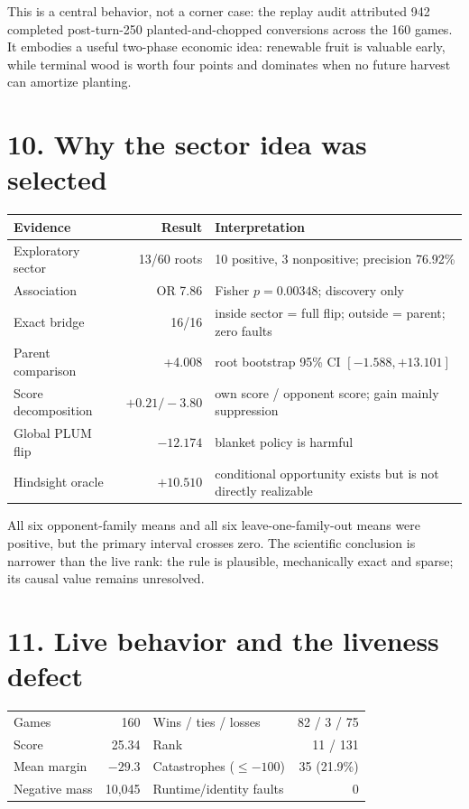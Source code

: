 \documentclass[10pt,a4paper]{article}
\begin{document}
This is a central behavior, not a corner case: the replay audit attributed 942 completed
post-turn-250 planted-and-chopped conversions across the 160 games. It embodies a useful
two-phase economic idea: renewable fruit is valuable early, while terminal wood is worth
four points and dominates when no future harvest can amortize planting.

\section*{10. Why the sector idea was selected}

\begin{tabularx}{\textwidth}{@{}l r Y@{}}
\toprule
\textbf{Evidence} & \textbf{Result} & \textbf{Interpretation} \\
\midrule
Exploratory sector & 13/60 roots & 10 positive, 3 nonpositive; precision 76.92\% \\
Association & OR 7.86 & Fisher $p=0.00348$; discovery only \\
Exact bridge & 16/16 & inside sector = full flip; outside = parent; zero faults \\
Parent comparison & +4.008 & root bootstrap 95\% CI $[-1.588,+13.101]$ \\
Score decomposition & $+0.21/-3.80$ & own score / opponent score; gain mainly suppression \\
Global PLUM flip & $-12.174$ & blanket policy is harmful \\
Hindsight oracle & $+10.510$ & conditional opportunity exists but is not directly realizable \\
\bottomrule
\end{tabularx}

All six opponent-family means and all six leave-one-family-out means were positive, but the
primary interval crosses zero. The scientific conclusion is narrower than the live rank:
the rule is plausible, mechanically exact and sparse; its causal value remains unresolved.

\section*{11. Live behavior and the liveness defect}

\begin{tabularx}{\textwidth}{@{}l r l r@{}}
\toprule
Games & 160 & Wins / ties / losses & 82 / 3 / 75 \\
Score & 25.34 & Rank & 11 / 131 \\
Mean margin & $-29.3$ & Catastrophes ($\le-100$) & 35 (21.9\%) \\
Negative mass & 10,045 & Runtime/identity faults & 0 \\
\bottomrule
\end{tabularx}
\end{document}
